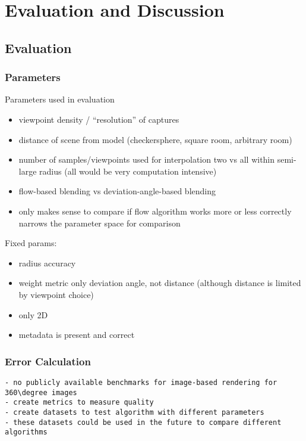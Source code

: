 \chapter{Evaluation and Discussion}

\section{Evaluation}
\subsection{Parameters}
Parameters used in evaluation
\begin{itemize}
  \item viewpoint density / ``resolution'' of captures
  \item distance of scene from model (checkersphere, square room, arbitrary room)
  \item number of samples/viewpoints used for interpolation \ar two vs all within semi-large radius (all would be very computation intensive)
  \item flow-based blending vs deviation-angle-based blending
  \item only makes sense to compare if flow algorithm works more or less correctly \ar narrows the parameter space for comparison
\end{itemize}

Fixed params:
\begin{itemize}
  \item radius accuracy
  \item weight metric only deviation angle, not distance (although distance is limited by viewpoint choice)
  \item only 2D
  \item metadata is present and correct
\end{itemize}

\subsection{Error Calculation}

\begin{verbatim}
- no publicly available benchmarks for image-based rendering for 360\degree images
- create metrics to measure quality
- create datasets to test algorithm with different parameters
- these datasets could be used in the future to compare different algorithms
\end{verbatim}

